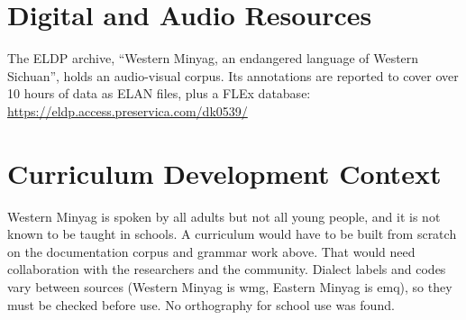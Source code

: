 \documentclass[12pt]{article}
\begin{document}
\section{Digital and Audio Resources}
The ELDP archive, ``Western Minyag, an endangered language of Western Sichuan'', holds an audio-visual corpus. Its annotations are reported to cover over 10 hours of data as ELAN files, plus a FLEx database: \url{https://eldp.access.preservica.com/dk0539/}

\section{Curriculum Development Context}
Western Minyag is spoken by all adults but not all young people, and it is not known to be taught in schools. A curriculum would have to be built from scratch on the documentation corpus and grammar work above. That would need collaboration with the researchers and the community. Dialect labels and codes vary between sources (Western Minyag is wmg, Eastern Minyag is emq), so they must be checked before use. No orthography for school use was found.
\end{document}
